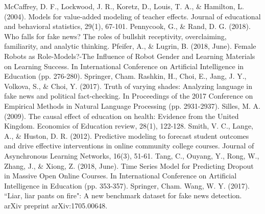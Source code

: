 \documentclass[12pt, final]{article}
\begin{document}
\begin{thebibliography}{1}
     McCaffrey, D. F., Lockwood, J. R., Koretz, D., Louis, T. A., \& Hamilton, L. (2004). Models for value-added modeling of teacher effects. Journal of educational and behavioral statistics, 29(1), 67-101.
     Pennycook, G., \& Rand, D. G. (2018). Who falls for fake news? The roles of bullshit receptivity, overclaiming, familiarity, and analytic thinking.
     Pfeifer, A., \& Lugrin, B. (2018, June). Female Robots as Role-Models?-The Influence of Robot Gender and Learning Materials on Learning Success. In International Conference on Artificial Intelligence in Education (pp. 276-280). Springer, Cham.
     Rashkin, H., Choi, E., Jang, J. Y., Volkova, S., \& Choi, Y. (2017). Truth of varying shades: Analyzing language in fake news and political fact-checking. In Proceedings of the 2017 Conference on Empirical Methods in Natural Language Processing (pp. 2931-2937).
     Silles, M. A. (2009). The causal effect of education on health: Evidence from the United Kingdom. Economics of Education review, 28(1), 122-128.
     Smith, V. C., Lange, A., \& Huston, D. R. (2012). Predictive modeling to forecast student outcomes and drive effective interventions in online community college courses. Journal of Asynchronous Learning Networks, 16(3), 51-61.
     Tang, C., Ouyang, Y., Rong, W., Zhang, J., \& Xiong, Z. (2018, June). Time Series Model for Predicting Dropout in Massive Open Online Courses. In International Conference on Artificial Intelligence in Education (pp. 353-357). Springer, Cham.
     Wang, W. Y. (2017). ``Liar, liar pants on fire": A new benchmark dataset for fake news detection. arXiv preprint arXiv:1705.00648.
  \end{thebibliography}
\end{document}
